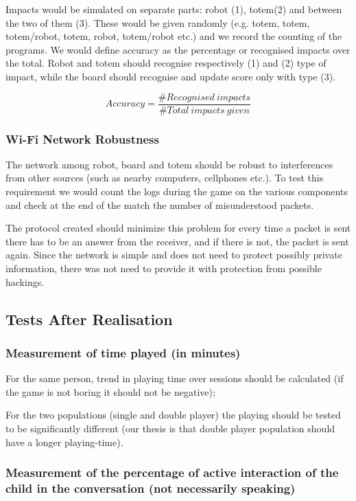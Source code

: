 \documentclass[a4paper,twoside]{book}
\begin{document}
Impacts would be simulated on separate parts: robot (1), totem(2) and between the two of them (3). These would be given randomly (e.g. totem, totem, totem/robot, totem, robot, totem/robot etc.) and we record the counting of the programs. We would define accuracy as the percentage or recognised impacts over the total. Robot and totem should recognise respectively (1) and (2) type of impact, while the board should recognise and update score only with type (3).

\[Accuracy=\frac{\#Recognised\ impacts}{\#Total\ impacts\ given}\]

\subsubsection*{Wi-Fi Network Robustness}

The network among robot, board and totem should be robust to interferences from other sources (such as nearby computers, cellphones etc.). To test this requirement we would count the logs during the game on the various components and check at the end of the match the number of misunderstood packets. 

The protocol created should minimize this problem for every time a packet is sent there has to be an answer from the receiver, and if there is not, the packet is sent again. Since the network is simple and does not need to protect possibly private information, there was not need to provide it with protection from possible hackings.

\subsection{Tests After Realisation}

\subsubsection*{Measurement of time played (in minutes)}

For the same person, trend in playing time over sessions should be calculated (if the game is not boring it should not be negative);

For the two populations (single and double player) the playing should be tested to be significantly different (our thesis is that double player population should have a longer playing-time).

\subsubsection*{Measurement of the percentage of active interaction of the child in the conversation (not necessarily speaking)}
\end{document}
